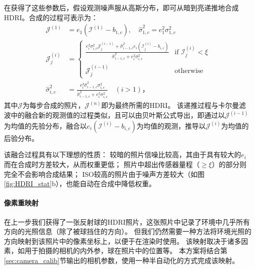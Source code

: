 在获得了这些参数后，假设观测噪声服从高斯分布，即可从暗到亮递推地合成HDRI。合成的过程可表示为：
\begin{equation}
\begin{aligned}
    \mathcal{J}^{(1)} &= e_1 \left(\mathcal{I}^{(1)} - b_{1,c}\right),\quad
    \hat{\sigma}_{1,c}^2 = e_1^2 \sigma_{1,c}^2 \\
    \mathcal{J}^{(i)}_j &= \begin{cases}
    \frac{e_i^2 \sigma_{i,c}^2 \mathcal{J}^{(i-1)}_j + \hat{\sigma}_{i-1,c}^2 e_i \left(\mathcal{I}^{(i)}_j - b_{i,c}\right)}{\hat{\sigma}_{i-1,c}^2 + e_i^2 \sigma_{i,c}^2} & \text{if } \mathcal{I}^{(i)}_j < \xi \\
    \mathcal{J}^{(i-1)}_j & \text{otherwise}
    \end{cases}\\
    \hat{\sigma}_{i,c}^2 &= \frac{e_i^2 \hat{\sigma}_{i-1,c}^2 \sigma_{i,c}^2}{\hat{\sigma}_{i-1,c}^2 + e_i^2 \sigma_{i,c}^2}
    \quad (i > 1)\text{，}
\end{aligned}
\end{equation}
其中$\mathcal{J}$为每步合成的照片，$\mathcal{J}^{(n)}$即为最终所需的HDRI。
该递推过程与卡尔曼滤波中的融合新的观测值的过程类似，且可以由贝叶斯公式导出，即通过以$\mathcal{J}^{(i-1)}$为均值的先验分布，融合以$e_i\left(\mathcal{I}^{(i)} - b_{i,c}\right)$为均值的观测，推导以$\mathcal{J}^{(i)}$为均值的后验分布。

该融合过程具有以下理想的性质：
较暗的照片信噪比较高，其由于具有较大的$e_i$而在合成时方差较大，从而权重更低；
照片中超出传感器量程（$\geq\xi$）的部分则完全不会影响合成结果；
ISO较高的照片由于噪声方差较大（如图\ref{fig:HDRI_stat}b），也能自动在合成中降低权重。

\paragraph{像素重映射}
在上一步我们获得了一张反射球的HDRI照片，这张照片中记录了环境中几乎所有方向的光照信息（除了被球挡住的方向）。
但我们仍然需要一种方法将环境光照的方向映射到该照片中的像素坐标上，以便于在渲染时使用。
该映射取决于诸多因素，如用于拍摄的相机的内外参，球在照片中的位置等。
本方案将结合第\ref{sec:camera_calib}节输出的相机参数，使用一种半自动化的方式完成该映射。

